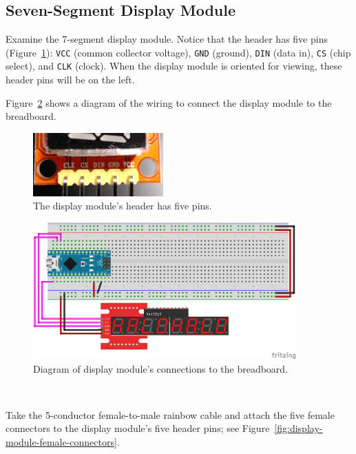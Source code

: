 \subsection{Seven-Segment Display Module}

Examine the 7-segment display module.
Notice that the header has five pins (Figure~\ref{fig:display-module-header}): \texttt{VCC} (common collector voltage), \texttt{GND} (ground), \texttt{DIN} (data in), \texttt{CS} (chip select), and \texttt{CLK} (clock).
When the display module is oriented for viewing, these header pins will be on the left.

Figure~\ref{fig:display-diagram} shows a diagram of the wiring to connect the display module to the breadboard.

\begin{figure}
    \centering
    \includegraphics[width=5cm]{display/display-module-header}
    \caption{The display module's header has five pins.
    \label{fig:display-module-header}}
\end{figure}

\begin{figure}
    \centering
    \includegraphics[width=0.9\textwidth]{fritzing_diagrams/display-max7219}
    \caption{Diagram of display module's connections to the breadboard.
    \label{fig:display-diagram}}
\end{figure}

\disconnect\

Take the 5-conductor female-to-male rainbow cable and attach the five female connectors to the display module's five header pins;
see Figure~\ref{fig:display-module-female-connectors}.

